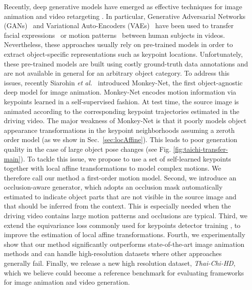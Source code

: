 \documentclass{article}
\def\etal{\textit{et al.}}
\begin{document}
Recently, deep generative models have emerged as effective techniques for image animation and video retargeting \cite{balakrishnansynthesizing,zablotskaia2019dwnet, bansal2018recycle,Zakharov_2019_CVPR,Shysheya_2019_CVPR,siarohin2018animating,wang2018video,wiles2018x2face,hao2018Geaturegan,liu2019gesture}. In particular, Generative Adversarial Networks (GANs)~\cite{goodfellow2014generative} and Variational Auto-Encoders (VAEs)~\cite{kingma2013auto} have been used to transfer facial expressions~\cite{wang2018video} or motion patterns~\cite{bansal2018recycle} between human subjects in videos.
Nevertheless, these approaches usually rely on pre-trained models in order to extract object-specific representations such as keypoint locations. Unfortunately, these pre-trained models are built using costly ground-truth data annotations \cite{balakrishnansynthesizing,Shysheya_2019_CVPR,hao2018Geaturegan} and are not available in general for an arbitrary object category. To address this issues, recently
Siarohin \etal~\cite{siarohin2018animating} introduced Monkey-Net, the first object-agnostic deep model for image animation. Monkey-Net encodes motion information via keypoints learned in a self-supervised fashion. At test time, the {source image} is animated according to the corresponding keypoint trajectories estimated in the {driving video}.
The major weakness of Monkey-Net is that it poorly models object appearance transformations in the keypoint neighborhoods assuming a zeroth order model (as we show in Sec.~\ref{sec:locAffine}). This leads to poor generation quality in the case of large object pose changes (see Fig. \ref{fig:taichi-transfer-main}).
To tackle this issue, we propose to use a set of self-learned keypoints together with local affine transformations to model complex motions. We therefore call our method a first-order motion model. Second, we introduce an occlusion-aware generator, which adopts an occlusion mask automatically estimated to indicate object parts that are not visible in the source image and that should be inferred from the context. This is especially needed when the driving video contains large motion patterns and occlusions are typical.
Third, we extend the equivariance loss commonly used for keypoints detector training \cite{jakabunsupervised,zhao2018learning}, to improve the estimation of local affine transformations. Fourth, we experimentally show that our method significantly outperforms state-of-the-art image animation methods and can handle high-resolution datasets where other approaches generally fail. Finally, we release a new high resolution dataset, \textit{Thai-Chi-HD}, which we believe could become a reference benchmark for evaluating frameworks for image animation and video generation.
\end{document}
